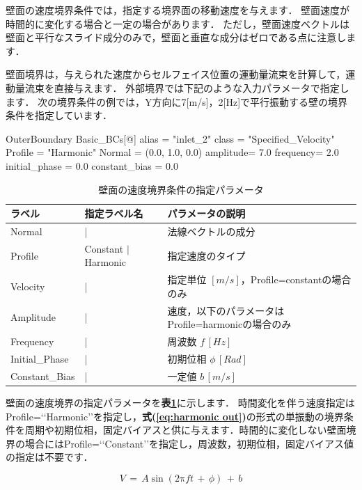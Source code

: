壁面の速度境界条件では，指定する境界面の移動速度を与えます．
壁面速度が時間的に変化する場合と一定の場合があります．
ただし，壁面速度ベクトルは壁面と平行なスライド成分のみで，壁面と垂直な成分はゼロである点に注意します．

壁面境界は，与えられた速度からセルフェイス位置の運動量流束を計算して，運動量流束を直接与えます．
外部境界では下記のような入力パラメータで指定します．
次の境界条件の例では，Y方向に7[m/s]，2[Hz]で平行振動する壁の境界条件を指定しています．

{\small
\begin{program}
OuterBoundary {
  Basic_BCs[@] {
    alias    = "inlet_2"
    class    = "Specified_Velocity"
    Profile  = "Harmonic"
    Normal   = (0.0, 1.0, 0.0)
    amplitude= 7.0
    frequency= 2.0
    initial_phase = 0.0
    constant_bias = 0.0
  }
}
\end{program}
}

\begin{table}[htdp]
\caption{壁面の速度境界条件の指定パラメータ}
\begin{center}
\small
\begin{tabular}{lll} \toprule
ラベル & 指定ラベル名 & パラメータの説明\\ \midrule
Normal & | & 法線ベクトルの成分\\
Profile & Constant $|$ Harmonic & 指定速度のタイプ\\
Velocity & | & 指定単位 $[m/s]$，Profile=constantの場合のみ\\
Amplitude & | & 速度，以下のパラメータはProfile=harmonicの場合のみ\\
Frequency & | & 周波数 $f\, [Hz]$\\
Initial\_Phase & | & 初期位相 $\phi\, [Rad]$\\
Constant\_Bias & | & 一定値 $b\, [m/s]$\\
\bottomrule
\end{tabular}
\end{center}
\label{tbl:wall parameter out}
\end{table}

壁面の速度境界の指定パラメータを\textbf{表\ref{tbl:wall parameter out}}に示します．
時間変化を伴う速度指定はProfile=\lq\lq Harmonic\rq\rq を指定し，\textbf{式(\ref{eq:harmonic out})}の形式の単振動の境界条件を周期や初期位相，固定バイアスと供に与えます．時間的に変化しない壁面境界の場合にはProfile=\lq\lq Constant\rq\rq を指定し，周波数，初期位相，固定バイアス値の指定は不要です．

\begin{equation}
V \,{=}\, A \sin \left( 2 \mathrm{\pi} ft \,+\, \phi \right) \,+\, b
\label{eq:harmonic out}
\end{equation}


